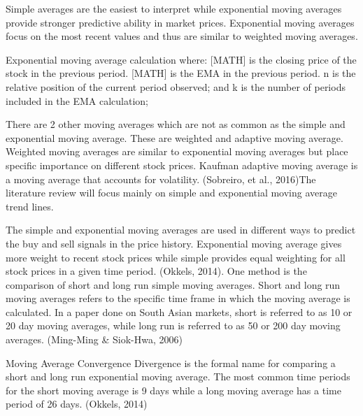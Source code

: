\documentclass[12pt,preprint, authoryear]{elsarticle}
\numberwithin{equation}{section}
\numberwithin{figure}{section}
\numberwithin{table}{section}
\begin{document}
Simple averages are the easiest to interpret while exponential moving
averages provide stronger predictive ability in market prices.
Exponential moving averages focus on the most recent values and thus are
similar to weighted moving averages.

Exponential moving average calculation where: {[}MATH{]} is the closing
price of the stock in the previous period. {[}MATH{]} is the EMA in the
previous period. n is the relative position of the current period
observed; and k is the number of periods included in the EMA
calculation;

There are 2 other moving averages which are not as common as the simple
and exponential moving average. These are weighted and adaptive moving
average. Weighted moving averages are similar to exponential moving
averages but place specific importance on different stock prices.
Kaufman adaptive moving average is a moving average that accounts for
volatility. (Sobreiro, et al., 2016)The literature review will focus
mainly on simple and exponential moving average trend lines.

The simple and exponential moving averages are used in different ways to
predict the buy and sell signals in the price history. Exponential
moving average gives more weight to recent stock prices while simple
provides equal weighting for all stock prices in a given time period.
(Okkels, 2014). One method is the comparison of short and long run
simple moving averages. Short and long run moving averages refers to the
specific time frame in which the moving average is calculated. In a
paper done on South Asian markets, short is referred to as 10 or 20 day
moving averages, while long run is referred to as 50 or 200 day moving
averages. (Ming-Ming \& Siok-Hwa, 2006)

Moving Average Convergence Divergence is the formal name for comparing a
short and long run exponential moving average. The most common time
periods for the short moving average is 9 days while a long moving
average has a time period of 26 days. (Okkels, 2014)
\end{document}
